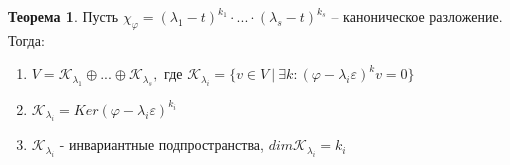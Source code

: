 \documentclass[a4paper, 12pt]{article}
\theoremstyle{definition}
\newtheorem*{theorem}{Теорема}
\begin{document}
    \begin{theorem}
        Пусть $\chi_\varphi = (\lambda_1 - t)^{k_1}\cdot...
        \cdot(\lambda_s - t)^{k_s}$ -- каноническое разложение.
        Тогда:
        \begin{enumerate}
            \item  $V = \mathcal{K}_{\lambda_1} \oplus...\oplus
            \mathcal{K}_{\lambda_s}, \text{ где } \mathcal{K}_{\lambda_i} 
            = \{v \in V\ |\ \exists k: (\varphi - \lambda_i
            \varepsilon)^kv = 0\}$
            \item $\mathcal{K}_{\lambda_i} = Ker(\varphi - \lambda_i
            \varepsilon)^{k_i}$
            \item $\mathcal{K}_{\lambda_i}$ - инвариантные подпространства,
            $dim \mathcal{K}_{\lambda_i} = k_i$ 
        \end{enumerate}
    \end{theorem}
\end{document}
